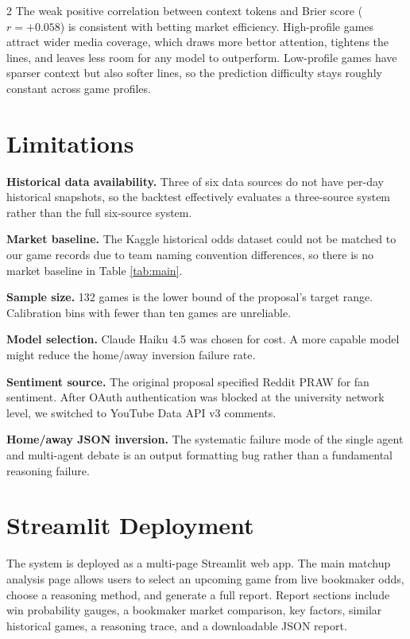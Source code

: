 \documentclass[11pt]{article}
\begin{document}
\begin{multicols}{2}
The weak positive correlation between context tokens and Brier score ($r = +0.058$) is consistent with betting market efficiency. High-profile games attract wider media coverage, which draws more bettor attention, tightens the lines, and leaves less room for any model to outperform. Low-profile games have sparser context but also softer lines, so the prediction difficulty stays roughly constant across game profiles.

\section{Limitations}
\label{sec:limitations}

\textbf{Historical data availability.} Three of six data sources do not have per-day historical snapshots, so the backtest effectively evaluates a three-source system rather than the full six-source system.

\textbf{Market baseline.} The Kaggle historical odds dataset could not be matched to our game records due to team naming convention differences, so there is no market baseline in Table \ref{tab:main}.

\textbf{Sample size.} 132 games is the lower bound of the proposal's target range. Calibration bins with fewer than ten games are unreliable.

\textbf{Model selection.} Claude Haiku 4.5 was chosen for cost. A more capable model might reduce the home/away inversion failure rate.

\textbf{Sentiment source.} The original proposal specified Reddit PRAW for fan sentiment. After OAuth authentication was blocked at the university network level, we switched to YouTube Data API v3 comments.

\textbf{Home/away JSON inversion.} The systematic failure mode of the single agent and multi-agent debate is an output formatting bug rather than a fundamental reasoning failure.

\section{Streamlit Deployment}

The system is deployed as a multi-page Streamlit web app. The main matchup analysis page allows users to select an upcoming game from live bookmaker odds, choose a reasoning method, and generate a full report. Report sections include win probability gauges, a bookmaker market comparison, key factors, similar historical games, a reasoning trace, and a downloadable JSON report.


\end{multicols}
\end{document}
